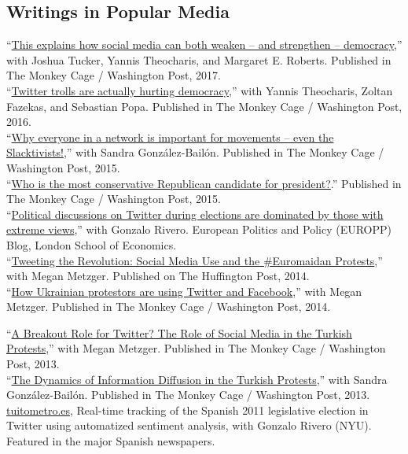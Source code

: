 \documentclass[margin,line,11pt]{resume}
\newcommand{\nl}{\vspace{0.10in}\\}
\begin{document}
\begin{resume}
                \section{\mysidestyle Writings in Popular Media}
``\href{https://www.washingtonpost.com/news/monkey-cage/wp/2017/12/06/this-explains-how-social-media-can-both-weaken-and-strengthen-democracy/?utm_term=.d52c930452e9}{This explains how social media can both weaken -- and strengthen -- democracy},'' with Joshua Tucker, Yannis Theocharis, and Margaret E. Roberts. Published in The Monkey Cage / Washington Post, 2017.\nl               
``\href{https://www.washingtonpost.com/news/monkey-cage/wp/2016/11/04/twitter-trolls-hurt-democracy-more-than-you-realize-heres-how/}{Twitter trolls are actually hurting democracy},'' with Yannis Theocharis, Zoltan Fazekas, and Sebastian Popa. Published in The Monkey Cage / Washington Post, 2016.\nl
``\href{https://www.washingtonpost.com/news/monkey-cage/wp/2015/11/30/why-everyone-in-a-network-is-important-for-movements-even-the-slactivists/}{Why everyone in a network is important for movements -- even the Slacktivists!},'' with Sandra Gonz\'{a}lez-Bail\'{o}n. Published in The Monkey Cage / Washington Post, 2015.\nl
``\href{http://www.washingtonpost.com/blogs/monkey-cage/wp/2015/06/16/who-is-the-most-conservative-republican-candidate-for-president/}{Who is the most conservative Republican candidate for president?}.'' Published in The Monkey Cage / Washington Post, 2015.\nl
``\href{http://blogs.lse.ac.uk/politicsandpolicy/political-discussions-on-twitter-during-elections-are-dominated-by-those-with-extreme-views/}{Political discussions on Twitter during elections are dominated by those with extreme views},'' with Gonzalo Rivero. European Politics and Policy (EUROPP) Blog, London School of Economics.\nl
 ``\href{http://www.huffingtonpost.com/pablo-barbera/tweeting-the-revolution-s_b_4831104.html}{Tweeting the Revolution: Social Media Use and the \#Euromaidan Protests},'' with Megan Metzger. Published on The Huffington Post, 2014.\nl
``\href{http://www.washingtonpost.com/blogs/monkey-cage/wp/2013/12/04/strategic-use-of-facebook-and-twitter-in-ukrainian-protests/}{How Ukrainian protestors are using Twitter and Facebook},'' with Megan Metzger. Published in The Monkey Cage / Washington Post, 2014.\nl
\newpage

 ``\href{http://themonkeycage.org/2013/06/01/a-breakout-role-for-twitter-extensive-use-of-social-media-in-the-absence-of-traditional-media-by-turks-in-turkish-in-taksim-square-protests/}{A Breakout Role for Twitter? The Role of Social Media in the Turkish Protests},'' with Megan Metzger. Published in The Monkey Cage / Washington Post, 2013.\nl
 ``\href{http://themonkeycage.org/2013/06/30822/}{The Dynamics of Information Diffusion in the Turkish Protests},'' with Sandra Gonz\'{a}lez-Bail\'{o}n. Published in The Monkey Cage / Washington Post, 2013.\nl
\href{http://www.tuitometro.es}{tuitometro.es}, Real-time tracking of the Spanish 2011 legislative election in Twitter using automatized sentiment analysis, with Gonzalo Rivero (NYU). Featured in the major Spanish newspapers.
  

\end{resume}
\end{document}
